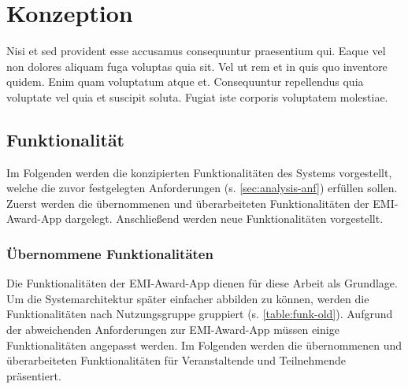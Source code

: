\chapter{Konzeption}

Nisi et sed provident esse accusamus consequuntur praesentium qui. Eaque vel non dolores aliquam fuga voluptas quia sit. Vel ut rem et in quis quo inventore quidem. Enim quam voluptatum atque et. Consequuntur repellendus quia voluptate vel quia et suscipit soluta. Fugiat iste corporis voluptatem molestiae.

\section{Funktionalität}

Im Folgenden werden die konzipierten Funktionalitäten des Systems vorgestellt,
welche die zuvor festgelegten Anforderungen (s. \autoref{sec:analysis-anf})
erfüllen sollen. Zuerst werden die übernommenen und überarbeiteten
Funktionalitäten der EMI-Award-App dargelegt. Anschließend werden neue
Funktionalitäten vorgestellt.

\subsection{Übernommene Funktionalitäten}

Die Funktionalitäten der EMI-Award-App dienen für diese Arbeit als Grundlage. Um
die Systemarchitektur später einfacher abbilden zu können, werden die
Funktionalitäten nach Nutzungsgruppe gruppiert (s. \autoref{table:funk-old}).
Aufgrund der abweichenden Anforderungen zur EMI-Award-App müssen einige
Funktionalitäten angepasst werden. Im Folgenden werden die übernommenen und
überarbeiteten Funktionalitäten für Veranstaltende und Teilnehmende präsentiert.

